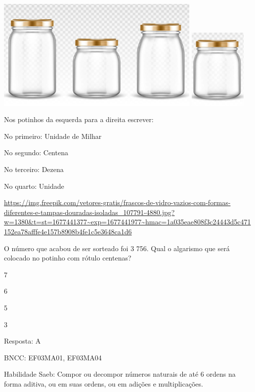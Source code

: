 \begin{escolha}
{\begin{escolha}
{\includegraphics[width=3.90833in,height=2.14168in]{media/image129.png}
\includegraphics[width=1.10010in,height=1.54180in]{media/image130.png}

Nos potinhos da esquerda para a direita escrever:

No primeiro: Unidade de Milhar

No segundo: Centena

No terceiro: Dezena

No quarto: Unidade

\url{https://img.freepik.com/vetores-gratis/frascos-de-vidro-vazios-com-formas-diferentes-e-tampas-douradas-isoladas_107791-4880.jpg?w=1380\&t=st=1677441377~exp=1677441977~hmac=1a035eae808f3c24443d5c471152ea78afffe4e157b8908b4fe1c5e3648ca1d6}

O número que acabou de ser sorteado foi 3 756. Qual o algarismo que será
colocado no potinho com rótulo centenas?

\begin{escolha}

\item
  7
\item
  6
\item
  5
\item
  3
\end{escolha}

Resposta: A

BNCC: EF03MA01, EF03MA04

Habilidade Saeb: Compor ou decompor números naturais de até 6 ordens na
forma aditiva, ou em suas ordens, ou em adições e multiplicações.

}
\end{escolha}}
\end{escolha}
